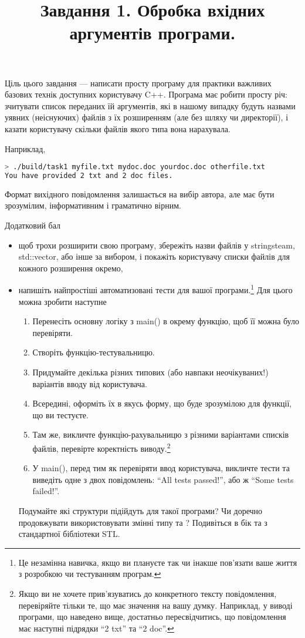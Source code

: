 \documentclass[12pt]{article}
\title{Завдання 1. Обробка вхідних аргументів програми.}
\begin{document}
\maketitle

Ціль цього завдання — написати просту програму для практики важливих базових технік доступних користувачу C++. Програма має робити просту річ: зчитувати список переданих їй аргументів, які в нашому випадку будуть назвами уявних (неіснуючих) файлів з їх розширенням (але без шляху чи директорії), і казати користувачу скільки файлів якого типа вона нарахувала. 

Наприклад,

\begin{lstlisting}[language=bash]
> ./build/task1 myfile.txt mydoc.doc yourdoc.doc otherfile.txt
You have provided 2 txt and 2 doc files.
\end{lstlisting}

Формат вихідного повідомлення залишається на вибір автора, але має бути зрозумілим, інформативним і граматично вірним.

\begin{center}
    \large{Додатковий бал}
\end{center}

\begin{itemize}
\item щоб трохи розширити свою програму, збережіть назви файлів у stringsteam, std::vector, або інше за вибором, і покажіть користувачу списки файлів для кожного розширення окремо,
\item напишіть найпростіші автоматизовані тести для вашої програми.\footnote{Це незамінна навичка, якщо ви плануєте так чи інакше пов'язати ваше життя з розробкою чи тестуванням програм.}
Для цього можна зробити наступне
\begin{enumerate}
    \item Перенесіть основну логіку з main() в окрему функцію, щоб її можна було перевіряти.
    \item Створіть функцію-тестувальницю.
    \item Придумайте декілька різних типових (або навпаки неочікуваних!) варіантів вводу від користувача.
    \item Всередині, оформіть їх в якусь форму, що буде зрозумілою для функції, що ви тестуєте.
    \item Там же, викличте функцію-рахувальницю з різними варіантами списків файлів, перевірте коректність виводу.\footnote{Якщо ви не хочете прив'язуватись до конкретного тексту повідомлення, перевіряйте тільки те, що має значення на вашу думку. Наприклад, у виводі програми, що наведено вище, достатньо пересвідчитись, що повідомлення має наступні підрядки ``2 txt'' та ``2 doc''.}
    \item У main(), перед тим як перевіряти ввод користувача, викличте тести та виведіть одне з двох повідомлень: ``All tests passed!'', або ж  ``Some tests failed!''.
\end{enumerate}
  Подумайте які структури підійдуть для такої програми? Чи доречно продовжувати використовувати змінні типу  та ? Подивіться в бік  та  з стандартної бібліотеки STL.
\end{itemize}
\end{document}
